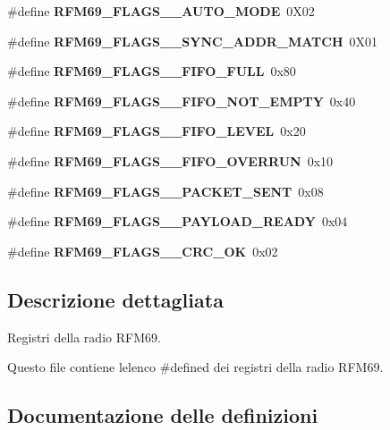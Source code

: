 \begin{DoxyCompactItemize}
\#define {\bfseries R\+F\+M69\+\_\+\+F\+L\+A\+G\+S\+\_\+\_\+\+A\+U\+T\+O\+\_\+\+M\+O\+DE}~0\+X02
\item 
\mbox{\label{_r_f_m69__registri_8h_af538166541e9e3f1a71b5ac22504f524}} 
\#define {\bfseries R\+F\+M69\+\_\+\+F\+L\+A\+G\+S\+\_\+\_\+\+S\+Y\+N\+C\+\_\+\+A\+D\+D\+R\+\_\+\+M\+A\+T\+CH}~0\+X01
\item 
\mbox{\label{_r_f_m69__registri_8h_a797c2a094562d12ba3a5d58d454715a0}} 
\#define {\bfseries R\+F\+M69\+\_\+\+F\+L\+A\+G\+S\+\_\+\_\+\+F\+I\+F\+O\+\_\+\+F\+U\+LL}~0x80
\item 
\mbox{\label{_r_f_m69__registri_8h_a6c97c528d8d8309d089f37189ef05b8f}} 
\#define {\bfseries R\+F\+M69\+\_\+\+F\+L\+A\+G\+S\+\_\+\_\+\+F\+I\+F\+O\+\_\+\+N\+O\+T\+\_\+\+E\+M\+P\+TY}~0x40
\item 
\mbox{\label{_r_f_m69__registri_8h_a1690814f23a15e38166320f828083456}} 
\#define {\bfseries R\+F\+M69\+\_\+\+F\+L\+A\+G\+S\+\_\+\_\+\+F\+I\+F\+O\+\_\+\+L\+E\+V\+EL}~0x20
\item 
\mbox{\label{_r_f_m69__registri_8h_a7915c99e7d7db4d24ce5ae6003f4db9b}} 
\#define {\bfseries R\+F\+M69\+\_\+\+F\+L\+A\+G\+S\+\_\+\_\+\+F\+I\+F\+O\+\_\+\+O\+V\+E\+R\+R\+UN}~0x10
\item 
\mbox{\label{_r_f_m69__registri_8h_aac6b8b9fd280707021bc13ff26231bed}} 
\#define {\bfseries R\+F\+M69\+\_\+\+F\+L\+A\+G\+S\+\_\+\_\+\+P\+A\+C\+K\+E\+T\+\_\+\+S\+E\+NT}~0x08
\item 
\mbox{\label{_r_f_m69__registri_8h_a4e9e9fb026399eafdce7202628c1bf94}} 
\#define {\bfseries R\+F\+M69\+\_\+\+F\+L\+A\+G\+S\+\_\+\_\+\+P\+A\+Y\+L\+O\+A\+D\+\_\+\+R\+E\+A\+DY}~0x04
\item 
\mbox{\label{_r_f_m69__registri_8h_afe6a5e2bc80ab940badac1cba44c5dc1}} 
\#define {\bfseries R\+F\+M69\+\_\+\+F\+L\+A\+G\+S\+\_\+\_\+\+C\+R\+C\+\_\+\+OK}~0x02
\end{DoxyCompactItemize}


\subsection{Descrizione dettagliata}
Registri della radio R\+F\+M69. 

Questo file contiene l\textquotesingle{}elenco {\ttfamily \#define}d dei registri della radio R\+F\+M69. 

\subsection{Documentazione delle definizioni}
\mbox{\label{_r_f_m69__registri_8h_adc910d7ae870ed0e23e4ca135e79392c}} 
